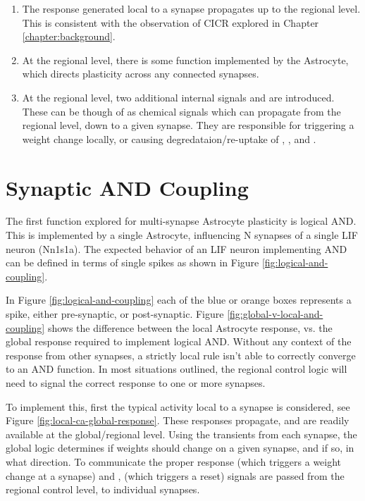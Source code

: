 \begin{enumerate}
\item The \ca response generated local to a synapse propagates up to the
  regional level. This is consistent with the observation of CICR explored in
  Chapter \ref{chapter:background}.
\item At the regional level, there is some function implemented by the
  Astrocyte, which directs plasticity across any connected synapses.
\item At the regional level, two additional internal signals \dser and
  \serca are introduced. These can be though of as chemical signals which can
  propagate from the regional level, down to a given synapse. They are
  responsible for triggering a weight change locally, or causing
  degredataion/re-uptake of \ipt, \kp, and \ca.
\end{enumerate}


\section{Synaptic AND Coupling}
The first function explored for multi-synapse Astrocyte plasticity is logical
AND. This is implemented by a single Astrocyte, influencing N synapses of a
single LIF neuron (Nn1s1a). The expected behavior of an LIF neuron implementing
AND can be defined in terms of single spikes as shown in Figure
\ref{fig:logical-and-coupling}.


In Figure \ref{fig:logical-and-coupling} each of the blue or orange boxes
represents a spike, either pre-synaptic, or post-synaptic. Figure
\ref{fig:global-v-local-and-coupling} shows the difference between the local
Astrocyte response, vs. the global response required to implement logical
AND. Without any context of the response from other synapses, a strictly local
rule isn't able to correctly converge to an AND function. In most situations
outlined, the regional control logic will need to signal the correct response to
one or more synapses.

To implement this, first the typical activity local to a synapse is considered,
see Figure \ref{fig:local-ca-global-response}. These \ca responses propagate,
and are readily available at the global/regional level. Using the \ca transients
from each synapse, the global logic determines if weights should change on a
given synapse, and if so, in what direction. To communicate the proper response
\dser (which triggers a weight change at a synapse) and \serca, (which triggers
a reset) signals are passed from the regional control level, to individual
synapses.

